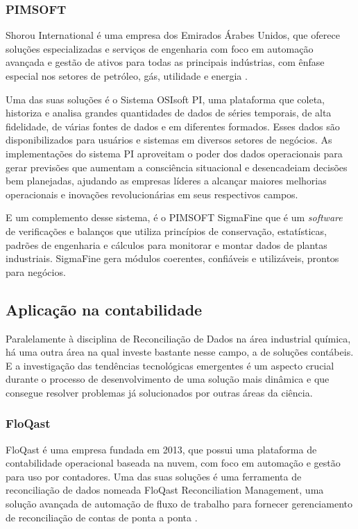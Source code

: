 \subsubsection{PIMSOFT}

Shorou International é uma empresa dos Emirados Árabes Unidos, que oferece soluções especializadas e serviços de engenharia com foco em automação avançada e gestão de ativos para todas as principais indústrias, com ênfase especial nos setores de petróleo, gás, utilidade e energia \cite{pimsoft}.

Uma das suas soluções é o Sistema OSIsoft PI, uma plataforma que coleta, historiza e analisa grandes quantidades de dados de séries temporais, de alta fidelidade, de várias fontes de dados e em diferentes formados. Esses dados são disponibilizados para usuários e sistemas em diversos setores de negócios. As implementações do sistema PI aproveitam o poder dos dados operacionais para gerar previsões que aumentam a consciência situacional e desencadeiam decisões bem planejadas, ajudando as empresas líderes a alcançar maiores melhorias operacionais e inovações revolucionárias em seus respectivos campos. 

E um complemento desse sistema, é o PIMSOFT SigmaFine que é um \textit{software} de verificações e balanços que utiliza princípios de conservação, estatísticas, padrões de engenharia e cálculos para monitorar e montar dados de plantas industriais. SigmaFine gera módulos coerentes, confiáveis e utilizáveis, prontos para negócios.

\subsection{Aplicação na contabilidade}

Paralelamente à disciplina de Reconciliação de Dados na área industrial química, há uma outra área na qual investe bastante nesse campo, a de soluções contábeis. E a investigação das tendências tecnológicas emergentes é um aspecto crucial durante o processo de desenvolvimento de uma solução mais dinâmica e que consegue resolver problemas já solucionados por outras áreas da ciência.

\subsubsection{FloQast}

FloQast é uma empresa fundada em 2013, que possui uma plataforma  de contabilidade operacional baseada na nuvem, com foco em automação e gestão para uso por contadores. Uma das suas soluções é uma ferramenta de reconciliação de dados nomeada FloQast Reconciliation Management, uma solução avançada de automação de fluxo de trabalho para fornecer gerenciamento de reconciliação de contas de ponta a ponta \cite{floqast}.

